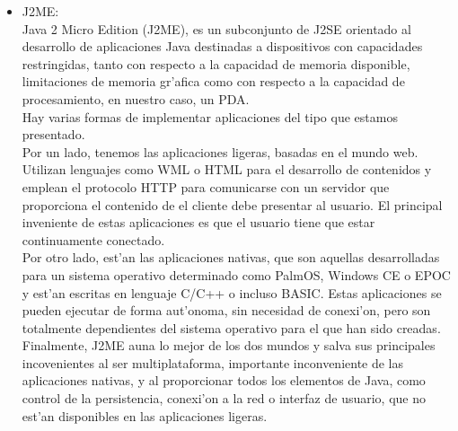 \begin{itemize}
\item J2ME:\bigskip \\Java 2 Micro Edition (J2ME), es un subconjunto de J2SE orientado al desarrollo de aplicaciones Java destinadas a dispositivos con capacidades restringidas, tanto con respecto a la capacidad de memoria disponible, limitaciones de memoria gr'afica como con respecto a la capacidad de procesamiento, en nuestro caso, un PDA.\bigskip \\Hay varias formas de implementar aplicaciones del tipo que estamos presentado.\bigskip \\Por un lado, tenemos las aplicaciones ligeras, basadas en el mundo web. Utilizan lenguajes como WML o HTML para el desarrollo de contenidos y emplean el protocolo HTTP para comunicarse con un servidor que proporciona el contenido de el cliente debe presentar al usuario. El principal inveniente de estas aplicaciones es que el usuario tiene que estar continuamente conectado.\bigskip \\Por otro lado, est'an las aplicaciones nativas, que son aquellas desarrolladas para un sistema operativo determinado como PalmOS, Windows CE o EPOC y est'an escritas en lenguaje C/C++ o incluso  BASIC. Estas aplicaciones se pueden ejecutar de forma aut'onoma, sin necesidad de conexi'on, pero son totalmente dependientes del sistema operativo para el que han sido creadas.\bigskip \\Finalmente, J2ME auna lo mejor de los dos mundos y salva sus principales incovenientes al ser multiplataforma, importante inconveniente de las aplicaciones nativas, y al proporcionar todos los elementos de Java, como control de la persistencia, conexi'on a la red o interfaz de usuario, que no est'an disponibles en las aplicaciones ligeras.


\end{itemize}
